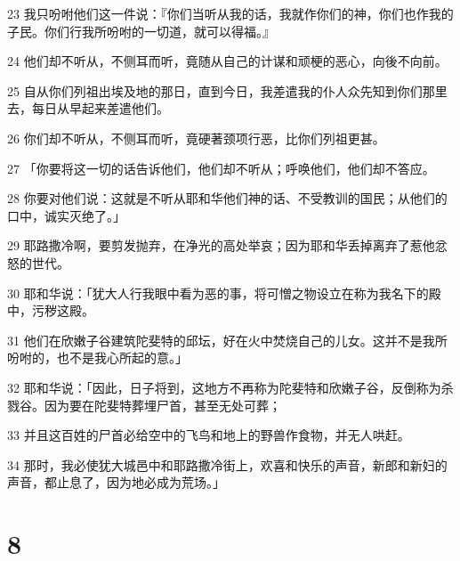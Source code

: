 \par 23 我只吩咐他们这一件说：『你们当听从我的话，我就作你们的神，你们也作我的子民。你们行我所吩咐的一切道，就可以得福。』
\par 24 他们却不听从，不侧耳而听，竟随从自己的计谋和顽梗的恶心，向後不向前。
\par 25 自从你们列祖出埃及地的那日，直到今日，我差遣我的仆人众先知到你们那里去，每日从早起来差遣他们。
\par 26 你们却不听从，不侧耳而听，竟硬著颈项行恶，比你们列祖更甚。
\par 27 「你要将这一切的话告诉他们，他们却不听从；呼唤他们，他们却不答应。
\par 28 你要对他们说：这就是不听从耶和华他们神的话、不受教训的国民；从他们的口中，诚实灭绝了。」
\par 29 耶路撒冷啊，要剪发抛弃，在净光的高处举哀；因为耶和华丢掉离弃了惹他忿怒的世代。
\par 30 耶和华说：「犹大人行我眼中看为恶的事，将可憎之物设立在称为我名下的殿中，污秽这殿。
\par 31 他们在欣嫩子谷建筑陀斐特的邱坛，好在火中焚烧自己的儿女。这并不是我所吩咐的，也不是我心所起的意。」
\par 32 耶和华说：「因此，日子将到，这地方不再称为陀斐特和欣嫩子谷，反倒称为杀戮谷。因为要在陀斐特葬埋尸首，甚至无处可葬；
\par 33 并且这百姓的尸首必给空中的飞鸟和地上的野兽作食物，并无人哄赶。
\par 34 那时，我必使犹大城邑中和耶路撒冷街上，欢喜和快乐的声音，新郎和新妇的声音，都止息了，因为地必成为荒场。」

\chapter{8}

